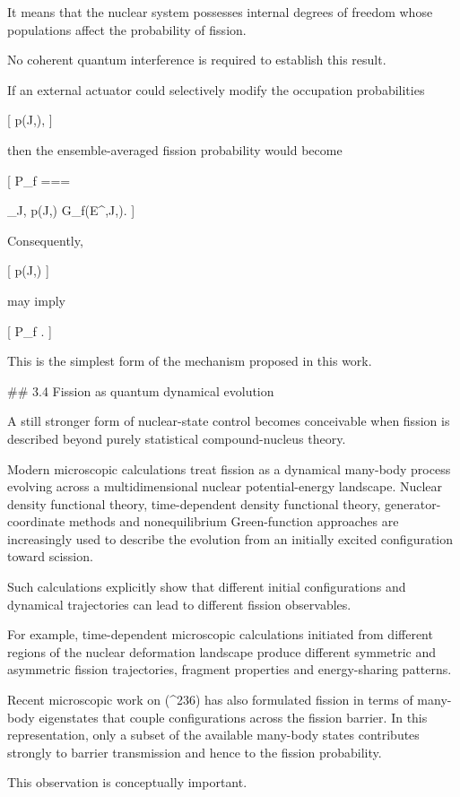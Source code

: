 It means that the nuclear system possesses internal degrees of freedom whose populations affect the probability of fission.

No coherent quantum interference is required to establish this result.

If an external actuator could selectively modify the occupation probabilities

[
p(J,\pi),
]

then the ensemble-averaged fission probability would become

[
P_f
===

\sum_{J,\pi}
p(J,\pi)
G_f(E^\ast,J,\pi).
]

Consequently,

[
\delta p(J,\pi)
]

may imply

[
\delta P_f
.
]

This is the simplest form of the mechanism proposed in this work.

## 3.4 Fission as quantum dynamical evolution

A still stronger form of nuclear-state control becomes conceivable when fission is described beyond purely statistical compound-nucleus theory.

Modern microscopic calculations treat fission as a dynamical many-body process evolving across a multidimensional nuclear potential-energy landscape. Nuclear density functional theory, time-dependent density functional theory, generator-coordinate methods and nonequilibrium Green-function approaches are increasingly used to describe the evolution from an initially excited configuration toward scission.

Such calculations explicitly show that different initial configurations and dynamical trajectories can lead to different fission observables.

For example, time-dependent microscopic calculations initiated from different regions of the nuclear deformation landscape produce different symmetric and asymmetric fission trajectories, fragment properties and energy-sharing patterns.

Recent microscopic work on (^{236}) has also formulated fission in terms of many-body eigenstates that couple configurations across the fission barrier. In this representation, only a subset of the available many-body states contributes strongly to barrier transmission and hence to the fission probability.

This observation is conceptually important.

